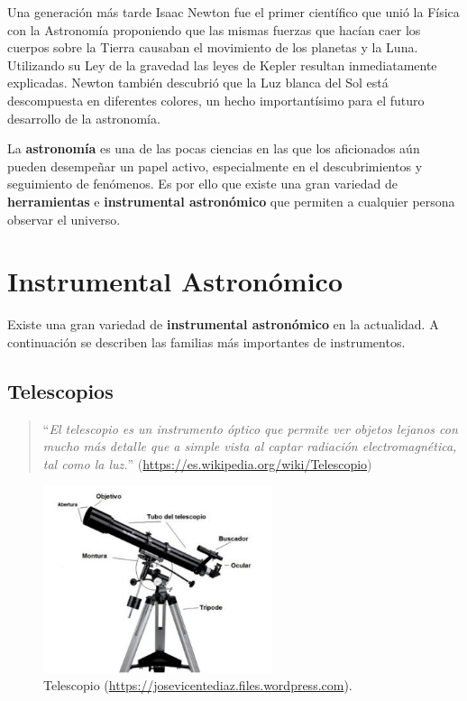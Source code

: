\bigskip
Una generación más tarde Isaac Newton fue el primer científico que unió la Física con la Astronomía proponiendo que las mismas fuerzas que hacían caer los cuerpos sobre la Tierra causaban el movimiento de los planetas y la Luna. Utilizando su Ley de la gravedad las leyes de Kepler resultan inmediatamente explicadas. Newton también descubrió que la Luz blanca del Sol está descompuesta en diferentes colores, un hecho importantísimo para el futuro desarrollo de la astronomía.

\bigskip
La \textbf{astronomía} es una de las pocas ciencias en las que los aficionados aún pueden desempeñar un papel activo, especialmente en el descubrimientos y seguimiento de fenómenos. Es por ello que existe una gran variedad de \textbf{herramientas} e \textbf{instrumental astronómico} que permiten a cualquier persona observar el universo.

\newpage
\section{Instrumental Astronómico}

Existe una gran variedad de \textbf{instrumental astronómico} en la actualidad. A continuación se describen las familias más importantes de instrumentos.

\subsection{Telescopios}

\begin{quote}``\textit{El telescopio es un instrumento óptico que permite ver objetos lejanos con mucho más detalle que a simple vista al captar radiación electromagnética, tal como la luz.}''
\newline(\url{https://es.wikipedia.org/wiki/Telescopio})
\end{quote}

\begin{figure}[!ht]
  \begin{center}
  \includegraphics[width=0.6\textwidth]{../images/telescopio.jpg}
  \caption[Telescopio]{Telescopio (\href{https://josevicentediaz.files.wordpress.com}{https://josevicentediaz.files.wordpress.com}).}
  \label{fig:diag_scrum}
  \end{center}
\end{figure}

